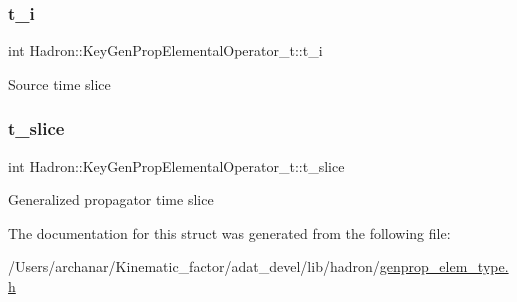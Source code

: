 \subsubsection{\texorpdfstring{t\_i}{t\_i}}
{\footnotesize\ttfamily int Hadron\+::\+Key\+Gen\+Prop\+Elemental\+Operator\+\_\+t\+::t\+\_\+i}

Source time slice \mbox{\label{structHadron_1_1KeyGenPropElementalOperator__t_aa25e47bfba87915da35d3379689bb2c9}} 
\subsubsection{\texorpdfstring{t\_slice}{t\_slice}}
{\footnotesize\ttfamily int Hadron\+::\+Key\+Gen\+Prop\+Elemental\+Operator\+\_\+t\+::t\+\_\+slice}

Generalized propagator time slice 

The documentation for this struct was generated from the following file\+:\begin{DoxyCompactItemize}
\item 
/\+Users/archanar/\+Kinematic\+\_\+factor/adat\+\_\+devel/lib/hadron/\mbox{\hyperlink{lib_2hadron_2genprop__elem__type_8h}{genprop\+\_\+elem\+\_\+type.\+h}}\end{DoxyCompactItemize}
